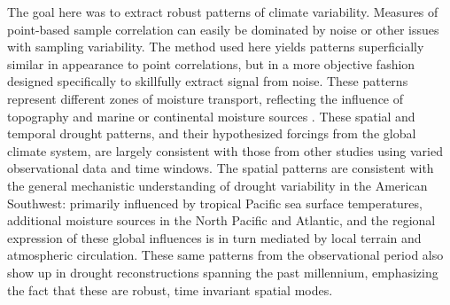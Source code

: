 \documentclass[10pt]{iopart}
\begin{document}
The goal here was to extract robust patterns of climate variability. Measures of point-based sample correlation can easily be dominated by noise or other issues with sampling variability. The method used here yields patterns superficially similar in appearance to point correlations, but in a more objective fashion designed specifically to skillfully extract signal from noise. These patterns represent different zones of moisture transport, reflecting the influence of topography and marine or continental moisture sources \parencite{Liu2010, Hu2011}. These spatial and temporal drought patterns, and their hypothesized forcings from the global climate system, are largely consistent with those from other studies using varied observational data and time windows\parencite{Comrie1999,Cook1999,McCabe1999,McCabe2004,Ryu2010,Seager2014,Herrmann2016}. The spatial patterns are consistent with the general mechanistic understanding of drought variability in the American Southwest: primarily influenced by tropical Pacific sea surface temperatures, additional moisture sources in the North Pacific and Atlantic, and the regional expression of these global influences is in turn mediated by local terrain and atmospheric circulation. These same patterns from the observational period also show up in drought reconstructions spanning the past millennium, emphasizing the fact that these are robust, time invariant spatial modes.
\end{document}
